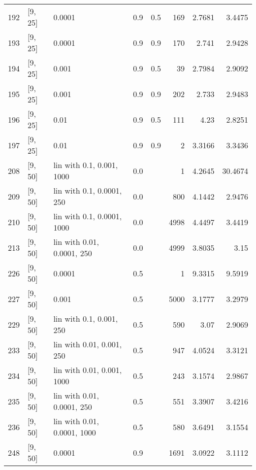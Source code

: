 \begin{longtable}{lllrrrrr}
  192 &            [9, 25] &                      0.0001 &      0.9 & 0.5 &  169 &   2.7681 &   3.4475 \\
  193 &            [9, 25] &                      0.0001 &      0.9 & 0.9 &  170 &    2.741 &   2.9428 \\
  194 &            [9, 25] &                       0.001 &      0.9 & 0.5 &   39 &   2.7984 &   2.9092 \\
  195 &            [9, 25] &                       0.001 &      0.9 & 0.9 &  202 &    2.733 &   2.9483 \\
  196 &            [9, 25] &                        0.01 &      0.9 & 0.5 &  111 &     4.23 &   2.8251 \\
  197 &            [9, 25] &                        0.01 &      0.9 & 0.9 &    2 &   3.3166 &   3.3436 \\
  208 &            [9, 50] &   lin with 0.1, 0.001, 1000 &      0.0 &     &    1 &   4.2645 &  30.4674 \\
  209 &            [9, 50] &   lin with 0.1, 0.0001, 250 &      0.0 &     &  800 &   4.1442 &   2.9476 \\
  210 &            [9, 50] &  lin with 0.1, 0.0001, 1000 &      0.0 &     & 4998 &   4.4497 &   3.4419 \\
  213 &            [9, 50] &  lin with 0.01, 0.0001, 250 &      0.0 &     & 4999 &   3.8035 &     3.15 \\
  226 &            [9, 50] &                      0.0001 &      0.5 &     &    1 &   9.3315 &   9.5919 \\
  227 &            [9, 50] &                       0.001 &      0.5 &     & 5000 &   3.1777 &   3.2979 \\
  229 &            [9, 50] &    lin with 0.1, 0.001, 250 &      0.5 &     &  590 &     3.07 &   2.9069 \\
  233 &            [9, 50] &   lin with 0.01, 0.001, 250 &      0.5 &     &  947 &   4.0524 &   3.3121 \\
  234 &            [9, 50] &  lin with 0.01, 0.001, 1000 &      0.5 &     &  243 &   3.1574 &   2.9867 \\
  235 &            [9, 50] &  lin with 0.01, 0.0001, 250 &      0.5 &     &  551 &   3.3907 &   3.4216 \\
  236 &            [9, 50] & lin with 0.01, 0.0001, 1000 &      0.5 &     &  580 &   3.6491 &   3.1554 \\
  248 &            [9, 50] &                      0.0001 &      0.9 &     & 1691 &   3.0922 &   3.1112 \\

\end{longtable}
